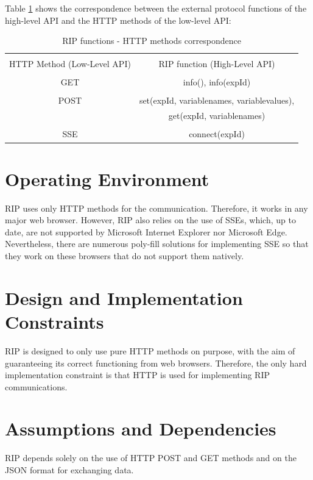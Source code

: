 Table \ref{tab:low-high-levels-correspondence} shows the correspondence between the external protocol functions of the high-level API and the HTTP methods of the low-level API:

\begin{table}[]
    \centering
    \begin{tabular}{|c|c|}\hline
         &  \\HTTP Method (Low-Level API) & RIP function (High-Level API)\\\hline
         &  \\GET & info(), info(expId) \\\hline
         &  \\POST & set(expId, variablenames, variablevalues),
            \\     & get(expId, variablenames) \\\hline %
         &  \\SSE & connect(expId) \\\hline
    \end{tabular}
    \caption{RIP functions - HTTP methods correspondence}
    \label{tab:low-high-levels-correspondence}
\end{table}

\section{Operating Environment}
RIP uses only HTTP methods for the communication. Therefore, it works in any major web browser. However, RIP also relies on the use of SSEs, which, up to date, are not supported by Microsoft Internet Explorer nor Microsoft Edge. Nevertheless, there are numerous poly-fill solutions for implementing SSE so that they work on these browsers that do not support them natively.

\section{Design and Implementation Constraints}
RIP is designed to only use pure HTTP methods on purpose, with the aim of guaranteeing its correct functioning from web browsers. Therefore, the only hard implementation constraint is that HTTP is used for implementing RIP communications.

\section{Assumptions and Dependencies}
RIP depends solely on the use of HTTP POST and GET methods and on the JSON format for exchanging data. 


